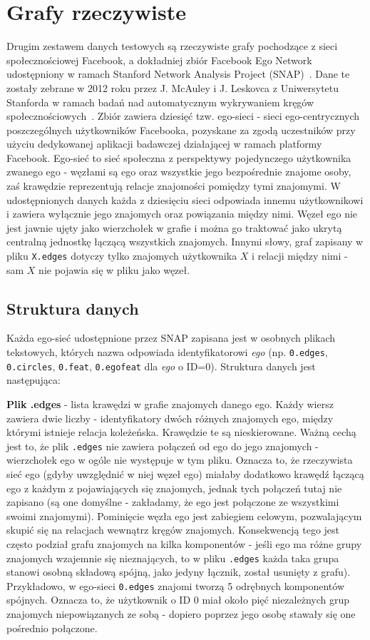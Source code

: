 \section{Grafy rzeczywiste}
Drugim zestawem danych testowych są rzeczywiste grafy pochodzące z sieci społecznościowej Facebook,
a dokładniej zbiór Facebook Ego Network udostępniony w ramach Stanford Network Analysis Project (SNAP)~\cite{snapnets}.
Dane te zostały zebrane w 2012 roku przez J. McAuley i J. Leskovca z Uniwersytetu Stanforda w ramach badań nad automatycznym wykrywaniem kręgów społecznościowych~\cite{McAuley2012}. Zbiór zawiera dziesięć tzw. ego-sieci - sieci ego-centrycznych poszczególnych użytkowników Facebooka, pozyskane za zgodą uczestników przy użyciu dedykowanej aplikacji badawczej działającej w ramach platformy Facebook. Ego-sieć to sieć społeczna z perspektywy pojedynczego użytkownika zwanego ego - węzłami są ego oraz wszystkie jego bezpośrednie znajome osoby, zaś krawędzie reprezentują relacje znajomości pomiędzy tymi znajomymi. W udostępnionych danych każda z dziesięciu sieci odpowiada innemu użytkownikowi i zawiera wyłącznie jego znajomych oraz powiązania między nimi. Węzeł ego nie jest jawnie ujęty jako wierzchołek w grafie i można go traktować jako ukrytą centralną jednostkę łączącą wszystkich znajomych. Innymi słowy, graf zapisany w pliku \verb|X.edges| dotyczy tylko znajomych użytkownika $X$ i relacji między nimi - sam $X$ nie pojawia się w pliku jako węzeł.

\subsection{Struktura danych}

Każda ego-sieć udostępnione przez SNAP zapisana jest w osobnych plikach tekstowych, których nazwa odpowiada identyfikatorowi \textit{ego} (np. \verb|0.edges|, \verb|0.circles|, \verb|0.feat|, \verb|0.egofeat| dla \textit{ego} o ID=0). Struktura danych jest następująca:

\textbf{Plik .edges} - lista krawędzi w grafie znajomych danego ego. Każdy wiersz zawiera dwie liczby - identyfikatory dwóch różnych znajomych ego, między którymi istnieje relacja koleżeńska. Krawędzie te są nieskierowane. Ważną cechą jest to, że plik \verb|.edges| nie zawiera połączeń od ego do jego znajomych - wierzchołek ego w ogóle nie występuje w tym pliku. Oznacza to, że rzeczywista sieć ego (gdyby uwzględnić w niej węzeł ego) miałaby dodatkowo krawędź łączącą ego z każdym z pojawiających się znajomych, jednak tych połączeń tutaj nie zapisano (są one domyślne - zakładamy, że ego jest połączone ze wszystkimi swoimi znajomymi). Pominięcie węzła ego jest zabiegiem celowym, pozwalającym skupić się na relacjach wewnątrz kręgów znajomych. Konsekwencją tego jest często podział grafu znajomych na kilka komponentów - jeśli ego ma różne grupy znajomych wzajemnie się nieznających, to w pliku \verb|.edges| każda taka grupa stanowi osobną składową spójną, jako jedyny łącznik, został usunięty z grafu). Przykładowo, w ego-sieci \verb|0.edges| znajomi tworzą 5 odrębnych komponentów spójnych. Oznacza to, że użytkownik o ID 0 miał około pięć niezależnych grup znajomych niepowiązanych ze sobą - dopiero poprzez jego osobę stawały się one pośrednio połączone.

